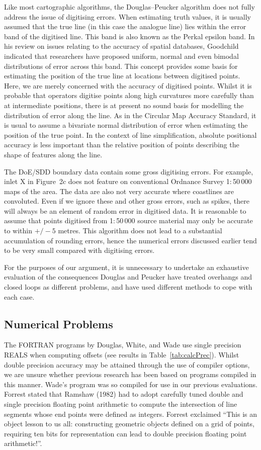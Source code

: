 \documentclass{egpubl}
\begin{document}
Like most cartographic algorithms, the Douglas--Peucker algorithm does not
fully address the issue of digitising errors. When estimating truth values,
it is usually assumed that the true line (in this case the analogue line)
lies within the error band of the digitised line. This band is also known as
the Perkal epsilon band. In his review on issues relating to the accuracy of
spatial databases, Goodchild\cite{Lev90} indicated that researchers have
proposed uniform, normal and even bimodal distributions of error across this
band. This concept provides some basis for estimating the position of the
true line at locations between digitised points. Here, we are merely
concerned with the accuracy of digitised points. Whilst it is probable that
operators digitise points along high curvatures more carefully than at
intermediate positions, there is at present no sound basis for modelling the
distribution of error along the line. As in the Circular Map Accuracy
Standard, it is usual to assume a bivariate normal distribution of error when
estimating the position of the true point. In the context of line
simplification, absolute positional accuracy is less important than the
relative position of points describing the shape of features along the line.

The DoE/SDD boundary data contain some gross digitising errors. For example,
inlet X in Figure~2c does not feature on conventional Ordnance Survey
1:\,50\,000 maps of the area. The data are also not very accurate where
coastlines are convoluted. Even if we ignore these and other gross errors,
such as spikes, there will always be an element of random error in digitised
data. It is reasonable to assume that points digitised from 1:\,50\,000
source material may only be accurate to within $+/-5$ metres. This algorithm
does not lead to a substantial accumulation of rounding errors, hence the
numerical errors discussed earlier tend to be very small compared with
digitising errors.

For the purposes of our argument, it is unnecessary to undertake an
exhaustive evaluation of the consequences Douglas and Peucker have treated
overhangs and closed loops as different problems, and have used different
methods to cope with each case.

\subsection{Numerical Problems}

The FORTRAN programs by Douglas, White, and Wade use single precision REALS
when computing offsets (see results in Table~\ref{tab:calcPrec}). Whilst
double precision accuracy may be attained through the use of compiler
options, we are unsure whether previous research has been based on programs
compiled in this manner. Wade's program was so compiled for use in our
previous evaluations. Forrest stated that Ramshaw (1982) had to adopt
carefully tuned double and single precision floating point arithmetic to
compute the intersection of line segments whose end points were defined as
integers. Forrest exclaimed ``This is an object lesson to us all:
constructing geometric objects defined on a grid of points, requiring ten
bits for representation can lead to double precision floating point
arithmetic!''.
\end{document}
